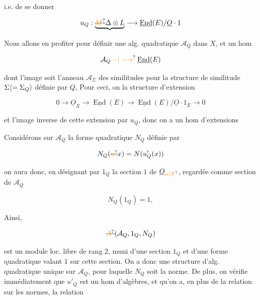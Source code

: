 i.e. de se donner

\[
u_Q:\underbrace{\deleted{\unsure{M}}\Delta\otimes L}\longrightarrow\underline{\operatorname{End}}(E)/\underline O\cdot1
\]

Nous allons en profiter pour définir une alg.  quadratique $\mathcal A_Q$ dans $X$, et un hom 

\[
\mathcal A_Q\mathbin{\unsure{-|\longrightarrow}}\underline{\operatorname{End}}(E)
\]

dont l'image soit l'anneau $\mathcal A_\Sigma$ des similitudes pour la structure de similitude $\Sigma\inserted{=\Sigma_Q}$ définie par $Q$,  Pour ceci, on  la structure d'extension

\[
0\longrightarrow\underline O_X\longrightarrow\underline{\operatorname{End}}(E)\longrightarrow\underline{\operatorname{End}}(E)/\underline O\cdot1_E\longrightarrow0
\]

et  l'image inverse de cette extension par $u_Q$, donc on a un hom d'extensions


Considérons sur $\mathcal A_Q$ la forme quadratique $N_Q$ définie par 

\[
N_Q(\deleted{\unsure{u}}x)=N(u'_Q(x))
\]

on aura donc, en désignant par $1_Q$ la section $1$ de $\underline O_{\unsure{\alpha|X}}$, regardée comme section de $\mathcal A_Q$

\[
N_Q(1_Q)=1,
\]

Ainsi,

\[
\deleted{\unsure{A}}(\mathcal A_Q,1_Q,N_Q)
\]

est un module loc. libre de rang 2, muni d'une section $1_Q$ et d'une forme quadratique valant $1$ sur cette section. On a donc une structure d'alg. quadratique unique sur $\mathcal A_Q$, pour laquelle $N_Q$ soit la norme. De plus, on vérifie immédiatement que $u'_Q$ est un hom d'algèbres, et qu'on a, en plus de la relation sur les normes, la relation

